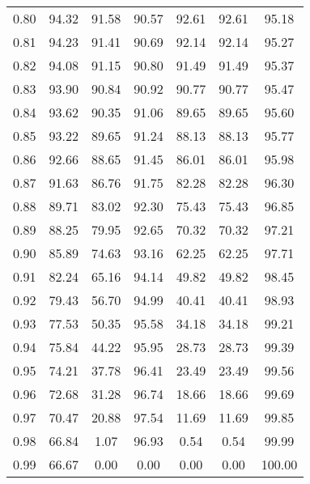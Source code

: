 \begin{tabular}{|c|c|c|c|c|c|c|}
      0.80 &     94.32 &     91.58 &      90.57 &   92.61 &      92.61 &         95.18 \\
      0.81 &     94.23 &     91.41 &      90.69 &   92.14 &      92.14 &         95.27 \\
      0.82 &     94.08 &     91.15 &      90.80 &   91.49 &      91.49 &         95.37 \\
      0.83 &     93.90 &     90.84 &      90.92 &   90.77 &      90.77 &         95.47 \\
      0.84 &     93.62 &     90.35 &      91.06 &   89.65 &      89.65 &         95.60 \\
      0.85 &     93.22 &     89.65 &      91.24 &   88.13 &      88.13 &         95.77 \\
      0.86 &     92.66 &     88.65 &      91.45 &   86.01 &      86.01 &         95.98 \\
      0.87 &     91.63 &     86.76 &      91.75 &   82.28 &      82.28 &         96.30 \\
      0.88 &     89.71 &     83.02 &      92.30 &   75.43 &      75.43 &         96.85 \\
      0.89 &     88.25 &     79.95 &      92.65 &   70.32 &      70.32 &         97.21 \\
      0.90 &     85.89 &     74.63 &      93.16 &   62.25 &      62.25 &         97.71 \\
      0.91 &     82.24 &     65.16 &      94.14 &   49.82 &      49.82 &         98.45 \\
      0.92 &     79.43 &     56.70 &      94.99 &   40.41 &      40.41 &         98.93 \\
      0.93 &     77.53 &     50.35 &      95.58 &   34.18 &      34.18 &         99.21 \\
      0.94 &     75.84 &     44.22 &      95.95 &   28.73 &      28.73 &         99.39 \\
      0.95 &     74.21 &     37.78 &      96.41 &   23.49 &      23.49 &         99.56 \\
      0.96 &     72.68 &     31.28 &      96.74 &   18.66 &      18.66 &         99.69 \\
      0.97 &     70.47 &     20.88 &      97.54 &   11.69 &      11.69 &         99.85 \\
      0.98 &     66.84 &      1.07 &      96.93 &    0.54 &       0.54 &         99.99 \\
      0.99 &     66.67 &      0.00 &       0.00 &    0.00 &       0.00 &        100.00 \\
\bottomrule
\end{tabular}
